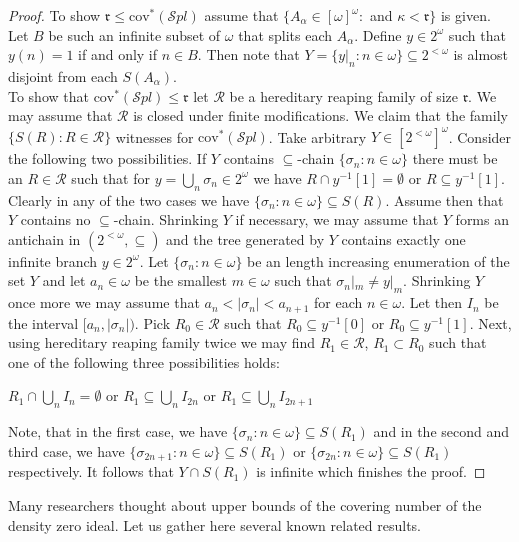 \documentclass[a4paper]{amsart}
\newcommand{\rrr}{\mathfrak{r}}
\newcommand{\Cantor}{2^{\omega}}
\newcommand{\cantor}{2^{<\omega}}
\newcommand{\cov}{\mathrm{cov}}
\newcommand{\SPL}{\mathcal{S}pl}
\begin{document}
\begin{proof}
    To show $\rrr\leq \cov^{*}(\SPL)$ assume that  $\{A_{\alpha}\in[\omega]^{\omega}:$ and $\kappa<\rrr\}$ is given. Let $B$ be such an infinite subset of $\omega$ that splits each $A_{\alpha}$. Define $y\in\Cantor$ such that $y(n)=1$ if and only if $n\in B$. Then note that $Y=\{y|_{n}:n\in\omega\}\subseteq \cantor$ is almost disjoint from each $S(A_{\alpha})$.\\
    To show that $\cov^{*}(\SPL)\leq\rrr$ let $\mathcal{R}$ be a hereditary reaping family of size $\rrr$. We may assume that $\mathcal{R}$ is closed under finite modifications. We claim that the family $\{S(R):R\in\mathcal{R}\}$ witnesses for $\cov^{*}(\SPL)$. Take arbitrary $Y\in[\cantor]^{\omega}$. Consider the following two possibilities. If $Y$ contains $\subseteq$-chain $\{\sigma_{n}:n\in\omega\}$ there must be an $R\in\mathcal{R}$ such that for $y=\bigcup_{n}\sigma_{n}\in\Cantor$ we have $R\cap y^{-1}[1]=\emptyset$ or $R\subseteq y^{-1}[1]$. Clearly in any of the two cases we have $\{\sigma_{n}:n\in\omega\}\subseteq S(R)$. Assume then that $Y$ contains no $\subseteq$-chain. Shrinking $Y$ if necessary, we may assume that $Y$ forms an antichain in $(\cantor,\subseteq)$ and the tree generated by $Y$ contains exactly one infinite branch $y\in\Cantor$. Let $\{\sigma_{n}:n\in\omega\}$ be an length increasing enumeration of the set $Y$ and let $a_{n}\in\omega$ be the smallest $m\in\omega$ such that $\sigma_{n}|_{m}\neq y|_{m}$. Shrinking $Y$ once more we may assume that $a_{n}<|\sigma_{n}|<a_{n+1}$ for each $n\in\omega$. Let then $I_{n}$ be the interval $[a_{n}, |\sigma_{n}|)$. Pick $R_{0}\in \mathcal{R}$ such that $R_{0}\subseteq y^{-1}[0]$ or $R_{0}\subseteq y^{-1}[1]$. Next, using hereditary reaping family twice we may find $R_{1}\in\mathcal{R}$, $R_{1}\subset R_{0}$ such that one of the following three possibilities holds:
    \begin{center}
        $R_{1}\cap \bigcup_{n}I_{n}=\emptyset$ or $R_{1}\subseteq \bigcup_{n}I_{2n}$ or $R_{1}\subseteq \bigcup_{n}I_{2n+1}$
    \end{center}
    Note, that in the first case, we have $\{\sigma_{n}:n\in\omega\}\subseteq S(R_{1})$ and in the second and third case, we have $\{\sigma_{2n+1}:n\in\omega\}\subseteq S(R_{1})$ or $\{\sigma_{2n}:n\in\omega\}\subseteq S(R_{1})$ respectively. It follows that $Y\cap S(R_{1})$ is infinite which finishes the proof.
\end{proof}
Many researchers thought about upper bounds of the covering number of the density zero ideal. Let us gather here several known related results.
\end{document}
